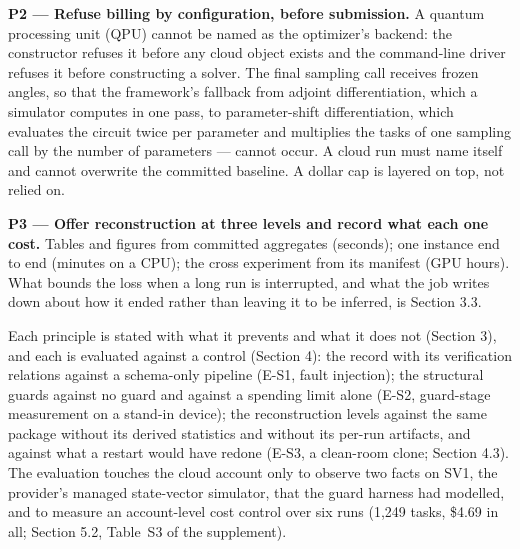 \documentclass[acmsmall,screen,review]{acmart}
\begin{document}
\textbf{P2 --- Refuse billing by configuration, before submission.} A quantum processing unit (QPU) cannot be named as the optimizer's backend: the constructor refuses it before any cloud object exists and the command-line driver refuses it before constructing a solver. The final sampling call receives frozen angles, so that the framework's fallback from adjoint differentiation, which a simulator computes in one pass, to parameter-shift differentiation, which evaluates the circuit twice per parameter and multiplies the tasks of one sampling call by the number of parameters --- cannot occur. A cloud run must name itself and cannot overwrite the committed baseline. A dollar cap is layered on top, not relied on.


\textbf{P3 --- Offer reconstruction at three levels and record what each one cost.} Tables and figures from committed aggregates (seconds); one instance end to end (minutes on a CPU); the cross experiment from its manifest (GPU hours). What bounds the loss when a long run is interrupted, and what the job writes down about how it ended rather than leaving it to be inferred, is Section 3.3.


Each principle is stated with what it prevents and what it does not (Section 3), and each is evaluated against a control (Section 4): the record with its verification relations against a schema-only pipeline (E-S1, fault injection); the structural guards against no guard and against a spending limit alone (E-S2, guard-stage measurement on a stand-in device); the reconstruction levels against the same package without its derived statistics and without its per-run artifacts, and against what a restart would have redone (E-S3, a clean-room clone; Section 4.3). The evaluation touches the cloud account only to observe two facts on SV1, the provider's managed state-vector simulator, that the guard harness had modelled, and to measure an account-level cost control over six runs (1,249 tasks, \$4.69 in all; Section 5.2, Table~S3 of the supplement).
\end{document}

